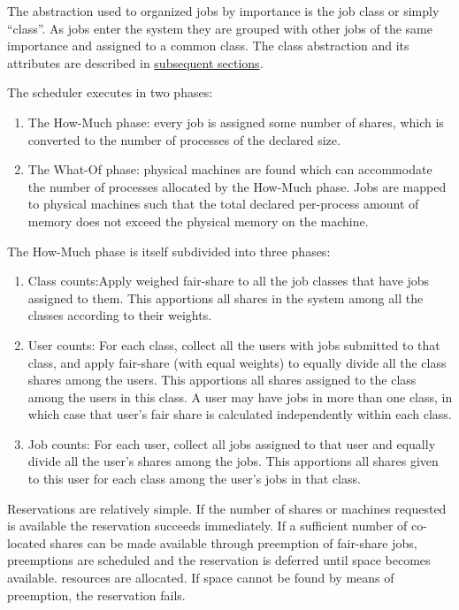     The abstraction used to organized jobs by importance is the job class or simply ``class''. As jobs enter 
    the system they are grouped with other jobs of the same importance and assigned to a common 
    class. The class abstraction and its attributes are described in \hyperref[sec:rm.job-classes]{subsequent sections}. 
    
    The scheduler executes in two phases: 
    \begin{enumerate}
        \item The How-Much phase: every job is assigned some number of shares, which is converted to the
          number of processes of the declared size.
        \item The What-Of phase: physical machines are found which can accommodate the number of
          processes allocated by the How-Much phase. Jobs are mapped to physical machines such that
          the total declared per-process amount of memory does not exceed the physical memory on the
          machine.  
    \end{enumerate}
      
    The How-Much phase is itself subdivided into three phases:
    \begin{enumerate}
        \item Class counts:Apply weighed fair-share to all the job classes that have jobs assigned to
          them. This apportions all shares in the system among all the classes according to their
          weights.  

        \item User counts: For each class, collect all the users with jobs submitted to that
          class, and apply fair-share (with equal weights) to equally divide all the class shares among
          the users. This apportions all shares assigned to the class among the users in this class.  A
          user may have jobs in more than one class, in which case that user's fair share is calculated
          independently within each class.
          
        \item Job counts: For each user, collect all jobs
          assigned to that user and equally divide all the user's shares among
          the jobs. This apportions all shares given to this user for each class among the user's
          jobs in that class. 
    \end{enumerate}

    Reservations are relatively simple. If the number of shares or machines requested is available
    the reservation succeeds immediately.  If a sufficient number of co-located shares can be made
    available through preemption of fair-share jobs, preemptions are scheduled and the reservation
    is deferred until space becomes available.  resources are allocated. If space cannot be found by
    means of preemption, the reservation fails.



